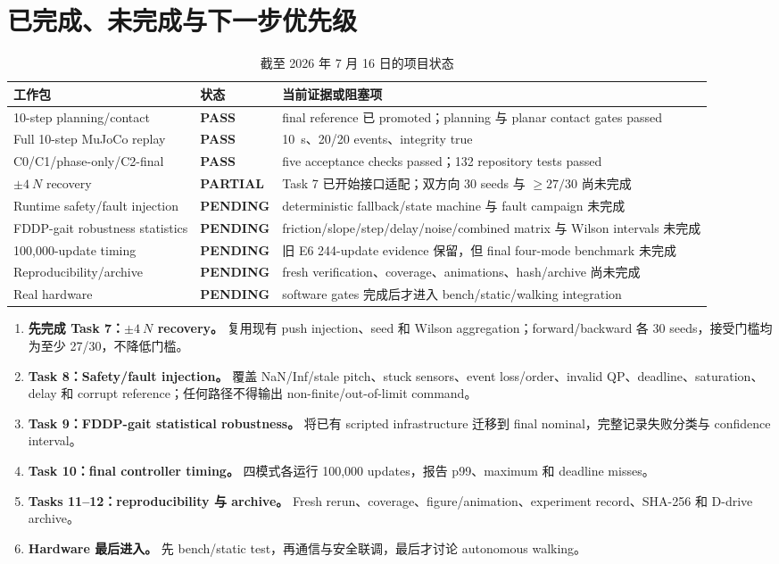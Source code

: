 \documentclass[UTF8,11pt,a4paper]{ctexart}
\newcommand{\pass}{\textcolor{green!45!black}{\textbf{PASS}}}
\newcommand{\partialstatus}{\textcolor{orange!75!black}{\textbf{PARTIAL}}}
\newcommand{\pending}{\textcolor{blue!60!black}{\textbf{PENDING}}}
\begin{document}
\section{已完成、未完成与下一步优先级}\label{sec:gaps}

\begin{table}[htbp]
\centering
\caption{截至 2026 年 7 月 16 日的项目状态}
\begin{tabularx}{\linewidth}{@{}p{3.7cm}p{1.7cm}X@{}}
\toprule
工作包 & 状态 & 当前证据或阻塞项 \\
\midrule
10-step planning/contact & \pass & final reference 已 promoted；planning 与 planar contact gates passed \\
Full 10-step MuJoCo replay & \pass & \SI{10}{s}、20/20 events、integrity true \\
C0/C1/phase-only/C2-final & \pass & five acceptance checks passed；132 repository tests passed \\
$\pm\SI{4}{N}$ recovery & \partialstatus & Task 7 已开始接口适配；双方向 30 seeds 与 $\geq27/30$ 尚未完成 \\
Runtime safety/fault injection & \pending & deterministic fallback/state machine 与 fault campaign 未完成 \\
FDDP-gait robustness statistics & \pending & friction/slope/step/delay/noise/combined matrix 与 Wilson intervals 未完成 \\
100,000-update timing & \pending & 旧 E6 244-update evidence 保留，但 final four-mode benchmark 未完成 \\
Reproducibility/archive & \pending & fresh verification、coverage、animations、hash/archive 尚未完成 \\
Real hardware & \pending & software gates 完成后才进入 bench/static/walking integration \\
\bottomrule
\end{tabularx}
\end{table}

\begin{enumerate}
 \item \textbf{先完成 Task 7：$\pm\SI{4}{N}$ recovery。} 复用现有 push injection、seed 和 Wilson aggregation；forward/backward 各 30 seeds，接受门槛均为至少 27/30，不降低门槛。
 \item \textbf{Task 8：Safety/fault injection。} 覆盖 NaN/Inf/stale pitch、stuck sensors、event loss/order、invalid QP、deadline、saturation、delay 和 corrupt reference；任何路径不得输出 non-finite/out-of-limit command。
 \item \textbf{Task 9：FDDP-gait statistical robustness。} 将已有 scripted infrastructure 迁移到 final nominal，完整记录失败分类与 confidence interval。
 \item \textbf{Task 10：final controller timing。} 四模式各运行 100,000 updates，报告 p99、maximum 和 deadline misses。
 \item \textbf{Tasks 11--12：reproducibility 与 archive。} Fresh rerun、coverage、figure/animation、experiment record、SHA-256 和 D-drive archive。
 \item \textbf{Hardware 最后进入。} 先 bench/static test，再通信与安全联调，最后才讨论 autonomous walking。
\end{enumerate}
\end{document}
